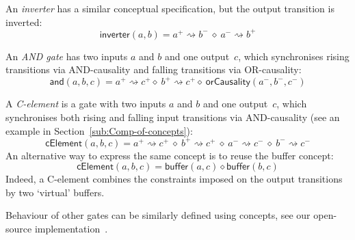 \documentclass[british, journal]{IEEEtran}
\begin{document}
An \emph{inverter} has a similar conceptual specification, but the
output transition is inverted:
\[
\mathsf{inverter}(a, b)=a^{+}\rightsquigarrow b^{-}\ \diamond\
a^{-}\rightsquigarrow b^{+}
\]

An \emph{AND gate} has two inputs $a$ and $b$ and one output~$c$, which
synchronises rising transitions via AND-causality and falling transitions
via OR-causality:
\[
\mathsf{and}(a, b, c)=a^{+}\!\rightsquigarrow\!c^{+} \diamond\
b^{+}\!\rightsquigarrow\! c^{+} \diamond\
\mathsf{orCausality}(a^{-},b^{-},c^{-})
\]

A \emph{C-element} is a gate with two inputs $a$ and $b$ and one
output~$c$, which synchronises both rising and falling input transitions
via AND-causality (see an example in Section~\ref{sub:Comp-of-concepts}):
\[
\mathsf{cElement}(a, b, c)=a^{+}\!\rightsquigarrow\! c^{+}\ \diamond\
b^{+}\!\rightsquigarrow\! c^{+}\ \diamond\ a^{-}\!\rightsquigarrow\! c^{-}\
\diamond\ b^{-}\!\rightsquigarrow\! c^{-}
\]
An alternative way to express the same concept is to reuse the buffer concept:
\[
\mathsf{cElement}(a, b, c)=\mathsf{buffer}(a, c) \diamond \mathsf{buffer}(b, c)
\]
Indeed, a C-element combines the constraints imposed on the output
transitions by two `virtual' buffers.

Behaviour of other gates can be similarly defined using concepts,
see our open-source implementation~\cite{2016_concepts_github}.
\end{document}
